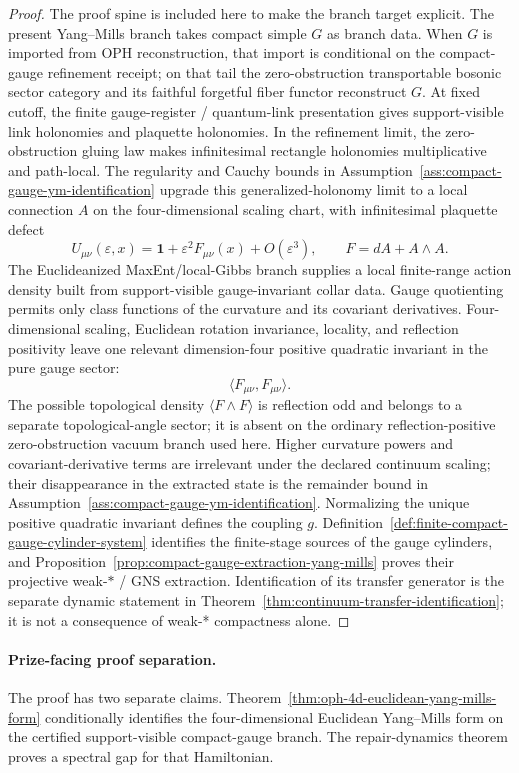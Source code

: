 \begin{proof}
The proof spine is included here to make the branch target explicit.
The present Yang--Mills branch takes compact simple \(G\) as branch data. When \(G\) is imported
from OPH reconstruction, that import is conditional on the compact-gauge refinement receipt; on
that tail the zero-obstruction transportable bosonic sector category and its faithful forgetful
fiber functor reconstruct \(G\). At fixed cutoff, the finite
gauge-register / quantum-link presentation gives support-visible link holonomies and plaquette
holonomies. In the refinement limit, the zero-obstruction gluing law makes infinitesimal
rectangle holonomies multiplicative and path-local. The regularity and Cauchy bounds in
Assumption~\ref{ass:compact-gauge-ym-identification} upgrade this generalized-holonomy limit to a
local connection \(A\) on the four-dimensional scaling chart, with infinitesimal plaquette defect
\[
U_{\mu\nu}(\varepsilon,x)
=
\mathbf 1+\varepsilon^2F_{\mu\nu}(x)+O(\varepsilon^3),
\qquad
F=dA+A\wedge A.
\]
The Euclideanized MaxEnt/local-Gibbs branch supplies a local finite-range action density built
from support-visible gauge-invariant collar data. Gauge quotienting permits only class functions
of the curvature and its covariant derivatives. Four-dimensional scaling, Euclidean rotation
invariance, locality, and reflection positivity leave one relevant dimension-four positive
quadratic invariant in the pure gauge sector:
\[
\langle F_{\mu\nu},F_{\mu\nu}\rangle.
\]
The possible topological density \(\langle F\wedge F\rangle\) is reflection odd and belongs to a
separate topological-angle sector; it is absent on the ordinary reflection-positive
zero-obstruction vacuum branch used here. Higher curvature powers and covariant-derivative terms
are irrelevant under the declared continuum scaling; their disappearance in the extracted state
is the remainder bound in Assumption~\ref{ass:compact-gauge-ym-identification}. Normalizing the
unique positive quadratic invariant defines the coupling \(g\).
Definition~\ref{def:finite-compact-gauge-cylinder-system} identifies the finite-stage sources of
the gauge cylinders, and Proposition~\ref{prop:compact-gauge-extraction-yang-mills} proves their
projective weak-\(*\) / GNS extraction. Identification of its transfer generator is the separate
dynamic statement in Theorem~\ref{thm:continuum-transfer-identification}; it is not a consequence
of weak-* compactness alone.
\end{proof}

\paragraph{Prize-facing proof separation.}
The proof has two separate claims. Theorem~\ref{thm:oph-4d-euclidean-yang-mills-form}
conditionally identifies the four-dimensional Euclidean Yang--Mills form on the certified
support-visible compact-gauge branch. The
repair-dynamics theorem proves a spectral gap for that Hamiltonian.


